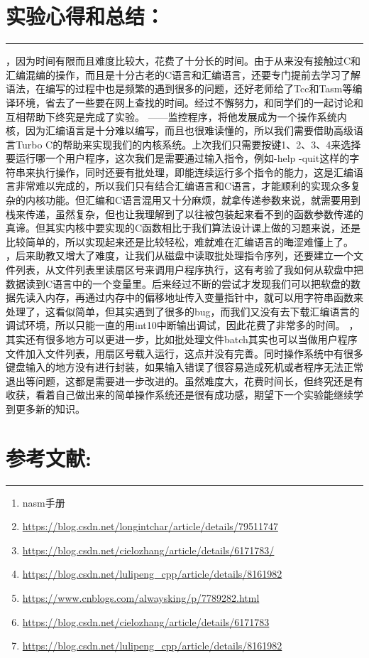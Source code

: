 \documentclass[UTF8]{article}
\begin{document}
\newpage
\section{实验心得和总结：}
\noindent\rule[0.2\baselineskip]{\textwidth}{0.5pt}
{\par{}，因为时间有限而且难度比较大，花费了十分长的时间。由于从来没有接触过C和汇编混编的操作，而且是十分古老的C语言和汇编语言，还要专门提前去学习了解语法，在编写的过程中也是频繁的遇到很多的问题，还好老师给了Tcc和Tasm等编译环境，省去了一些要在网上查找的时间。经过不懈努力，和同学们的一起讨论和互相帮助下终究是完成了实验。
——监控程序，将他发展成为一个操作系统内核，因为汇编语言是十分难以编写，而且也很难读懂的，所以我们需要借助高级语言Turbo C的帮助来实现我们的内核系统。上次我们只需要按键1、2、3、4来选择要运行哪一个用户程序，这次我们是需要通过输入指令，例如-help -quit这样的字符串来执行操作，同时还要有批处理，即能连续运行多个指令的能力，这是汇编语言非常难以完成的，所以我们只有结合汇编语言和C语言，才能顺利的实现众多复杂的内核功能。但汇编和C语言混用又十分麻烦，就拿传递参数来说，就需要用到栈来传递，虽然复杂，但也让我理解到了以往被包装起来看不到的函数参数传递的真谛。但其实内核中要实现的C函数相比于我们算法设计课上做的习题来说，还是比较简单的，所以实现起来还是比较轻松，难就难在汇编语言的晦涩难懂上了。
，后来助教又增大了难度，让我们从磁盘中读取批处理指令序列，还要建立一个文件列表，从文件列表里读扇区号来调用户程序执行，这有考验了我如何从软盘中把数据读到C语言中的一个变量里。后来经过不断的尝试才发现我们可以把软盘的数据先读入内存，再通过内存中的偏移地址传入变量指针中，就可以用字符串函数来处理了，这看似简单，但其实遇到了很多的bug，而我们又没有去下载汇编语言的调试环境，所以只能一直的用int10中断输出调试，因此花费了非常多的时间。
，其实还有很多地方可以更进一步，比如批处理文件batch其实也可以当做用户程序文件加入文件列表，用扇区号载入运行，这点并没有完善。同时操作系统中有很多键盘输入的地方没有进行封装，如果输入错误了很容易造成死机或者程序无法正常退出等问题，这都是需要进一步改进的。虽然难度大，花费时间长，但终究还是有收获，看着自己做出来的简单操作系统还是很有成功感，期望下一个实验能继续学到更多新的知识。}


\section{参考文献:}
\noindent\rule[0.2\baselineskip]{\textwidth}{0.5pt}
\begin{enumerate}[1)]
 \item nasm手册
 \item \url{https://blog.csdn.net/longintchar/article/details/79511747}
 \item \url{https://blog.csdn.net/cielozhang/article/details/6171783/}
 \item \url{https://blog.csdn.net/lulipeng_cpp/article/details/8161982}
 \item \url{https://www.cnblogs.com/alwaysking/p/7789282.html}
\item \url{https://blog.csdn.net/cielozhang/article/details/6171783}
\item
\url{https://blog.csdn.net/lulipeng_cpp/article/details/8161982}
\end{enumerate}
\end{document}
